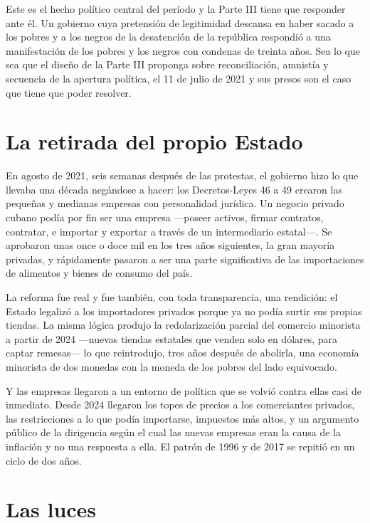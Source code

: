 Este es el hecho político central del período y la Parte III tiene que responder
ante él. Un gobierno cuya pretensión de legitimidad descansa en haber sacado a los
pobres y a los negros de la desatención de la república respondió a una
manifestación de los pobres y los negros con condenas de treinta años. Sea lo que
sea que el diseño de la Parte III proponga sobre reconciliación, amnistía y
secuencia de la apertura política, el 11 de julio de 2021 y sus presos son el caso
que tiene que poder resolver.

\section{La retirada del propio Estado}

En agosto de 2021, seis semanas después de las protestas, el gobierno hizo lo que
llevaba una década negándose a hacer: los Decretos-Leyes 46 a 49 crearon las
pequeñas y medianas empresas con personalidad jurídica. Un negocio privado cubano
podía por fin ser una empresa ---poseer activos, firmar contratos, contratar, e
importar y exportar a través de un intermediario estatal---. Se aprobaron unas once
o doce mil en los tres años siguientes, la gran mayoría privadas, y rápidamente
pasaron a ser una parte significativa de las importaciones de alimentos y bienes de
consumo del país.\unv{}

La reforma fue real y fue también, con toda transparencia, una rendición: el Estado
legalizó a los importadores privados porque ya no podía surtir sus propias tiendas.
La misma lógica produjo la redolarización parcial del comercio minorista a partir de
2024 ---nuevas tiendas estatales que venden solo en dólares, para captar remesas---
lo que reintrodujo, tres años después de abolirla, una economía minorista de dos
monedas con la moneda de los pobres del lado equivocado.

Y las empresas llegaron a un entorno de política que se volvió contra ellas casi de
inmediato. Desde 2024 llegaron los topes de precios a los comerciantes privados,
las restricciones a lo que podía importarse, impuestos más altos, y un argumento
público de la dirigencia según el cual las nuevas empresas eran la causa de la
inflación y no una respuesta a ella. El patrón de 1996 y de 2017 se repitió en un
ciclo de dos años.

\section{Las luces}

